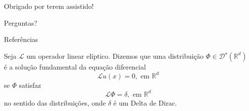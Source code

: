 \documentclass[portuguese,notheorems]{beamer}
\begin{document}
\appendix



\begin{frame}
    \centering
    \LARGE
    Obrigado por terem assistido!

    Perguntas?
\end{frame}

\begin{frame}[allowframebreaks]{Referências}


    \nocite{*}
    \printbibliography

\end{frame}

\begin{frame}
    Seja \(\mathcal{L}\) um operador linear elíptico. Dizemos que uma distribuição \( \Phi \in \mathcal{D}^\star(\mathbb{R}^d)\) é a solução fundamental da equação diferencial
    \[
        \mathcal{L}u(x) = 0, \text{ em } \mathbb{R}^d
    \]
    se \(\Phi\) satisfaz
    \[
        \mathcal{L}\Phi = \delta, \text{ em } \mathbb{R}^d
    \]
    no sentido das distribuições, onde \(\delta\) é um Delta de Dirac.
\end{frame}
\end{document}
